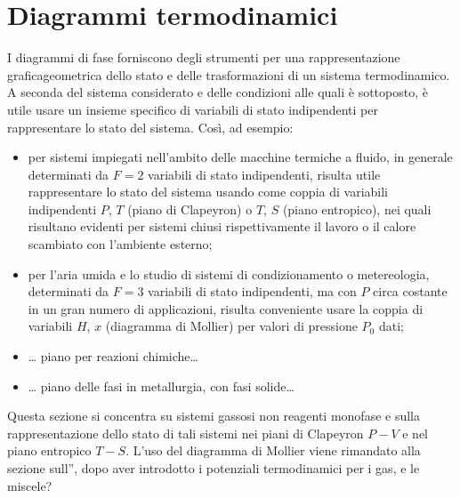 \documentclass[letterpaper,10pt,italian]{jupyterBook}
\begin{document}
\sphinxstepscope


\section{Diagrammi termodinamici}
\label{\detokenize{ch/thermodynamics/principles-phase-diagrams:diagrammi-termodinamici}}\label{\detokenize{ch/thermodynamics/principles-phase-diagrams:physics-hs-thermodynamics-foundation-principles-phase-diagrams}}\label{\detokenize{ch/thermodynamics/principles-phase-diagrams::doc}}
\sphinxAtStartPar
I diagrammi di fase forniscono degli strumenti per una rappresentazione grafica\sphinxhyphen{}geometrica dello stato e delle trasformazioni di un sistema termodinamico. A seconda del sistema considerato e delle condizioni alle quali è sottoposto, è utile usare un insieme specifico di variabili di stato indipendenti per rappresentare lo stato del sistema. Così, ad esempio:
\begin{itemize}
\item {} 
\sphinxAtStartPar
per sistemi impiegati nell’ambito delle macchine termiche a fluido, in generale determinati da \(F=2\) variabili di stato indipendenti, risulta utile rappresentare lo stato del sistema usando come coppia di variabili indipendenti \(P\), \(T\) (piano di Clapeyron) o \(T\), \(S\) (piano entropico), nei quali risultano evidenti per sistemi chiusi rispettivamente il lavoro o il calore scambiato con l’ambiente esterno;

\item {} 
\sphinxAtStartPar
per l’aria umida e lo studio di sistemi di condizionamento o metereologia, determinati da \(F=3\) variabili di stato indipendenti, ma con \(P\) circa costante in un gran numero di applicazioni, risulta conveniente usare la coppia di variabili \(H\), \(x\)  (diagramma di Mollier) per valori di pressione \(P_0\) dati;

\item {} 
\sphinxAtStartPar
 … piano per reazioni chimiche…

\item {} 
\sphinxAtStartPar
 … piano delle fasi in metallurgia, con fasi solide…

\end{itemize}

\sphinxAtStartPar
Questa sezione si concentra su sistemi gassosi non reagenti monofase e sulla rappresentazione dello stato di tali sistemi nei piani di Clapeyron \(P-V\) e nel piano entropico \(T-S\). L’uso del diagramma di Mollier viene rimandato alla sezione sull”{\hyperref[\detokenize{ch/thermodynamics/humid-air:physics-hs-thermodynamics-matter-humid-air}]{}},  dopo aver introdotto i potenziali termodinamici per i gas, e le miscele?
\end{document}
